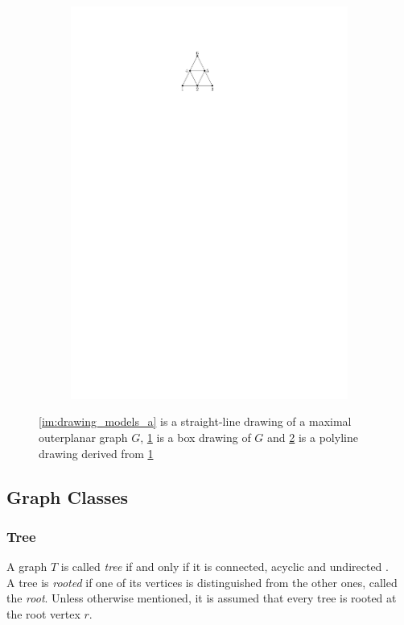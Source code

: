 \begin{figure}[H]
\begin{subfigure}{0.4\textwidth}
	\caption{}\label{im:drawing_models_b}
\end{subfigure}
\begin{subfigure}{0.4\textwidth}
	\centering
	\includegraphics[page=3,width=\linewidth]{graphics/preliminaries_drawing_models.pdf}
	\caption{}\label{im:drawing_models_c}
\end{subfigure}
	\caption{\ref{im:drawing_models_a} is a straight-line drawing of a maximal outerplanar graph $G$, \ref{im:drawing_models_b} is a box drawing of $G$ and \ref{im:drawing_models_c} is a polyline drawing derived from \ref{im:drawing_models_b}}\label{im:drawing_models}
\end{figure}

\subsection{Graph Classes}
\subsubsection{Tree}
A graph $T$ is called \emph{tree} if and only if it is connected, acyclic and undirected \cite[P. 1172]{DBLP:cormen_intro_to_algorithms}.\\
A tree is \emph{rooted} if one of its vertices is distinguished from the other ones, called the \emph{root}. Unless otherwise mentioned, it is assumed that every tree is rooted at the root vertex $r$. 

